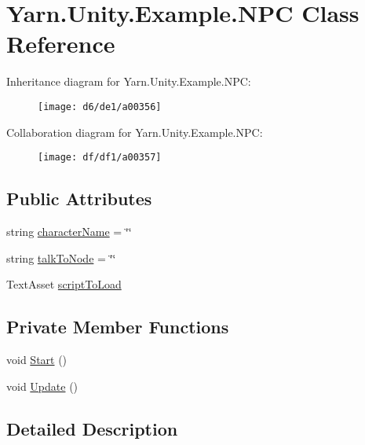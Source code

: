 \hypertarget{a00057}{\section{Yarn.\-Unity.\-Example.\-N\-P\-C Class Reference}
\label{a00057}
}


Inheritance diagram for Yarn.\-Unity.\-Example.\-N\-P\-C\-:
\nopagebreak
\begin{figure}[H]
\begin{center}
\leavevmode
\texttt{[image: d6/de1/a00356]}
\end{center}
\end{figure}


Collaboration diagram for Yarn.\-Unity.\-Example.\-N\-P\-C\-:
\nopagebreak
\begin{figure}[H]
\begin{center}
\leavevmode
\texttt{[image: df/df1/a00357]}
\end{center}
\end{figure}
\subsection*{Public Attributes}
\begin{DoxyCompactItemize}
\item 
string \hyperlink{a00057_a418ea7095bd8201559ed392f07905ca3}{character\-Name} = \char`\"{}\char`\"{}
\item 
string \hyperlink{a00057_a64f4f1fb66b2046a674e3ebf3b9fdb56}{talk\-To\-Node} = \char`\"{}\char`\"{}
\item 
Text\-Asset \hyperlink{a00057_a63145fb6ddf357e604d71bac04ca8a60}{script\-To\-Load}
\end{DoxyCompactItemize}
\subsection*{Private Member Functions}
\begin{DoxyCompactItemize}
\item 
void \hyperlink{a00057_a0bf37075312ea87c2e329cc363a328a6}{Start} ()
\item 
void \hyperlink{a00057_ab1bea5afabd1c2e1e991063b1579d062}{Update} ()
\end{DoxyCompactItemize}


\subsection{Detailed Description}


